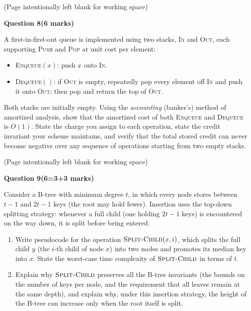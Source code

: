 \documentclass[12pt,letterpaper]{article}
\newcommand{\marksbox}[1]{%
  \vfill
  \begin{flushright}
    \fbox{\parbox[c][1.1cm][c]{1.3cm}{\centering #1}}
  \end{flushright}
}
\newcommand{\questiontitle}[2]{%
  \textbf{Question #1}\hfill\textbf{(#2 marks)}
}
\newcommand{\workingpage}{%
  \newpage
  \begin{center}
    (Page intentionally left blank for working space)
  \end{center}
}
\begin{document}
\marksbox{6}

\workingpage
\newpage

\questiontitle{8}{6}

A first-in-first-out queue is implemented using two stacks, \textsc{In} and
\textsc{Out}, each supporting \textsc{Push} and \textsc{Pop} at unit cost per
element:

\begin{itemize}
  \item \textsc{Enqueue}$(x)$: push $x$ onto \textsc{In}.
  \item \textsc{Dequeue}$()$: if \textsc{Out} is empty, repeatedly pop every
  element off \textsc{In} and push it onto \textsc{Out}; then pop and return the
  top of \textsc{Out}.
\end{itemize}

Both stacks are initially empty. Using the \emph{accounting} (banker's) method
of amortized analysis, show that the amortized cost of both \textsc{Enqueue}
and \textsc{Dequeue} is $O(1)$. State the charge you assign to each operation,
state the credit invariant your scheme maintains, and verify that the total
stored credit can never become negative over any sequence of operations
starting from two empty stacks.

\marksbox{6}

\workingpage
\newpage

\questiontitle{9}{6=3+3}

Consider a B-tree with minimum degree $t$, in which every node stores between
$t - 1$ and $2t - 1$ keys (the root may hold fewer). Insertion uses the
top-down splitting strategy: whenever a full child (one holding $2t - 1$ keys)
is encountered on the way down, it is split before being entered.

\begin{enumerate}
  \item[(i)] Write pseudocode for the operation $\textsc{Split-Child}(x, i)$,
  which splits the full child $y$ (the $i$-th child of node $x$) into two nodes
  and promotes its median key into $x$. State the worst-case time complexity of
  $\textsc{Split-Child}$ in terms of $t$.

  \item[(ii)] Explain why $\textsc{Split-Child}$ preserves all the B-tree
  invariants (the bounds on the number of keys per node, and the requirement
  that all leaves remain at the same depth), and explain why, under this
  insertion strategy, the height of the B-tree can increase only when the root
  itself is split.
\end{enumerate}
\end{document}
